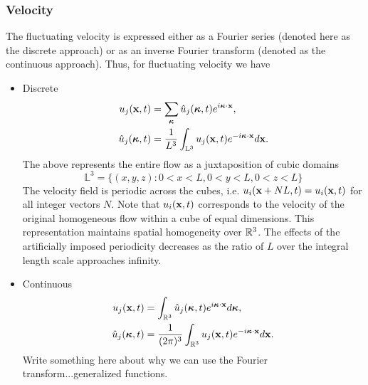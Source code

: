 \documentclass[oneside,a4paper,11pt]{report}
\begin{document}
\subsubsection{Velocity}
The fluctuating velocity is expressed either as a Fourier series (denoted here as the discrete approach) or as an inverse Fourier transform (denoted as the continuous approach). Thus, for fluctuating velocity we have 
\begin{itemize}
\item Discrete
\begin{align}
u_j(\mathbf{x},t) &= \sum_{\boldsymbol\kappa} \hat{u}_j(\boldsymbol\kappa,t) e^{i \boldsymbol\kappa \cdot \mathbf{x}}, \\
\hat{u}_j(\boldsymbol\kappa,t) &= \frac{1}{L^3} \int_{\mathbb{L}^3} u_j(\mathbf{x},t) e^{-i \boldsymbol\kappa \cdot \mathbf{x}} d\mathbf{x}.
\end{align}
The above represents the entire flow as a juxtaposition of cubic domains 
\begin{equation}
\mathbb{L}^3 = \{ (x,y,z): 0< x < L, 0 < y < L, 0< z< L \}
\end{equation}
The velocity field is periodic across the cubes, i.e. $u_i(\mathbf{x} + NL,t) = u_i(\mathbf{x},t)$ for all integer vectors $N$. Note that $u_i(\mathbf{x},t)$ corresponds to the velocity of the original homogeneous flow within a cube of equal dimensions. This representation maintains spatial homogeneity over ${\mathbb{R}^3}$. The effects of the artificially imposed periodicity decreases as the ratio of $L$ over the integral length scale approaches infinity.
\item Continuous
\begin{align}
u_j(\mathbf{x},t) &= \int_{\mathbb{R}^3} \hat{u}_j(\boldsymbol\kappa,t) e^{i\boldsymbol\kappa \cdot \mathbf{x}} d\boldsymbol\kappa, \\
\hat{u}_j(\boldsymbol\kappa,t) &= \frac{1}{(2\pi)^3} \int_{\mathbb{R}^3} u_j(\mathbf{x},t) e^{-i \boldsymbol\kappa \cdot \mathbf{x}} d\mathbf{x}.
\end{align}
Write something here about why we can use the Fourier transform...generalized functions.
\end{itemize}
\end{document}
